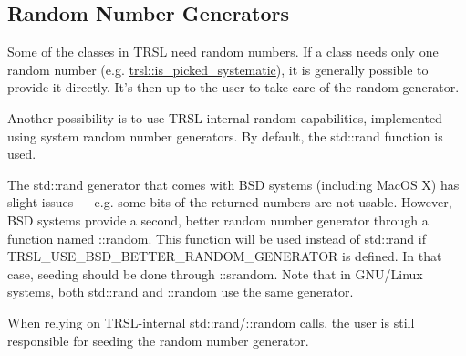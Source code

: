 \hypertarget{group__random}{
\subsection{Random Number Generators}
\label{group__random}
}
Some of the classes in TRSL need random numbers. If a class needs only one random number (e.g. \hyperlink{classtrsl_1_1is__picked__systematic}{trsl::is\_\-picked\_\-systematic}), it is generally possible to provide it directly. It's then up to the user to take care of the random generator.

Another possibility is to use TRSL-\/internal random capabilities, implemented using system random number generators. By default, the {\ttfamily std::rand} function is used.

The {\ttfamily std::rand} generator that comes with BSD systems (including MacOS X) has slight issues --- e.g. some bits of the returned numbers are not usable. However, BSD systems provide a second, better random number generator through a function named {\ttfamily ::random}. This function will be used instead of {\ttfamily std::rand} if TRSL\_\-USE\_\-BSD\_\-BETTER\_\-RANDOM\_\-GENERATOR is defined. In that case, seeding should be done through {\ttfamily ::srandom}. Note that in GNU/Linux systems, both {\ttfamily std::rand} and {\ttfamily ::random} use the same generator.

When relying on TRSL-\/internal {\ttfamily std::rand/::random} calls, the user is still responsible for seeding the random number generator. 